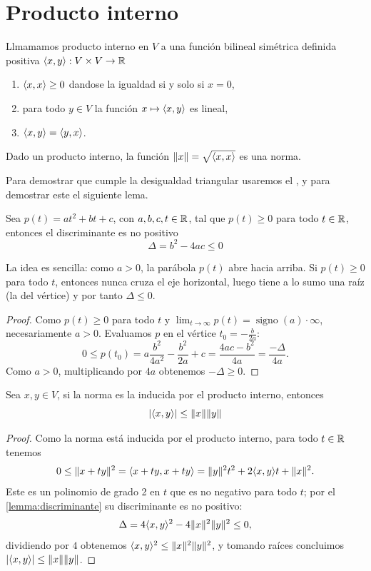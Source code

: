\section{Producto interno}
\begin{definition}
  Llmamamos producto interno en $V$ a una función bilineal  simétrica definida positiva $\langle x,y\rangle: V\times V\to \mathbb{R}$ \begin{enumerate}
    \item $\langle x,x\rangle\ge 0$ dandose la igualdad si y solo si $x=0$,
    \item para todo $y\in V$ la función $x\mapsto \langle x,y\rangle$ es lineal,
    \item $\langle x,y\rangle = \langle y,x\rangle$.
  \end{enumerate}
\end{definition}
\begin{proposition}
  Dado un producto interno, la función $\lVert x\rVert=\sqrt{\langle x,x\rangle} $ es una norma.
\end{proposition}
Para demostrar que cumple la desigualdad triangular usaremos el , y para demostrar este el siguiente lema.
\begin{lemma}\label{lemma:discriminante}
  Sea $p(t)=at^2+bt+c$, con $a,b,c,t\in \mathbb{R}$, tal que $p(t)\geq 0$ para todo $t\in \mathbb{R}$, entonces el discriminante es no positivo \[
      \Delta=b^2-4ac \leq 0
  \] 
\end{lemma}
La idea es sencilla: como $a>0$, la parábola $p(t)$ abre hacia arriba. Si $p(t)\ge 0$ para todo $t$, entonces nunca cruza el eje horizontal, luego tiene a lo sumo una raíz (la del vértice) y por tanto $\Delta\le 0$.

\begin{proof}
  Como $p(t)\ge 0$ para todo $t$ y $\lim_{t\to \infty}p(t)=\operatorname{signo}(a)\cdot\infty$, necesariamente $a>0$. Evaluamos $p$ en el vértice $t_0=-\frac{b}{2a}$: \[
    0\le p(t_0)=a\frac{b^2}{4a^2}-\frac{b^2}{2a}+c=\frac{4ac-b^2}{4a}=\frac{-\Delta}{4a}.
  \]
  Como $a>0$, multiplicando por $4a$ obtenemos $-\Delta\ge 0$.
\end{proof}
\begin{theorem}\label{thm:cauchy-schwarz}
  Sea $x,y\in V$, si la norma es la inducida por el producto interno, entonces \[
    \lvert\langle x,y\rangle\rvert\le \lVert x\rVert\lVert y\rVert
  \] 
\end{theorem}
\begin{proof}
  Como la norma está inducida por el producto interno, para todo $t\in \mathbb{R}$ tenemos \[
    0\le \lVert x+ty\rVert^2=\langle x+ty,x+ty\rangle=\lVert y\rVert^2t^2+2\langle x,y\rangle t+\lVert x\rVert^2.
  \]
  Este es un polinomio de grado 2 en $t$ que es no negativo para todo $t$; por el \cref{lemma:discriminante} su discriminante es no positivo: \[
    \Delta=4\langle x,y\rangle^2-4\lVert x\rVert^2\lVert y\rVert^2\le 0,
  \]
  dividiendo por $4$ obtenemos $\langle x,y\rangle^2\le \lVert x\rVert^2\lVert y\rVert^2$, y tomando raíces concluimos $\lvert\langle x,y\rangle\rvert\le \lVert x\rVert\lVert y\rVert$.
\end{proof}
